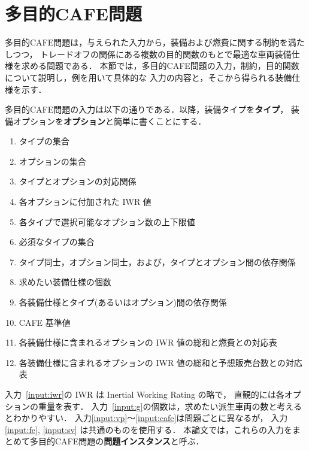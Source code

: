 \section{多目的CAFE問題}\label{sec:background}


多目的CAFE問題は，与えられた入力から，装備および燃費に関する制約を満たしつつ，
トレードオフの関係にある複数の目的関数のもとで最適な車両装備仕様を求める問題である．
本節では，多目的CAFE問題の入力，制約，目的関数について説明し，例を用いて具体的な
入力の内容と，そこから得られる装備仕様を示す．

多目的CAFE問題の入力は以下の通りである．以降，装備タイプを{\bf タイプ}，
装備オプションを{\bf オプション}と簡単に書くことにする．

\begin{enumerate} 
\setlength{\itemsep}{0cm}

 \item タイプの集合\label{input:vp}
\item オプションの集合\label{input:v}
\item タイプとオプションの対応関係\label{input:vp-v}
\item 各オプションに付加された IWR 値\label{input:iwr}
\item 各タイプで選択可能なオプション数の上下限値\label{input:ublb}
\item 必須なタイプの集合\label{input:req_vp}
\item タイプ同士，オプション同士，および，タイプとオプション間の依存関係
  \label{input:dependency}

\item 求めたい装備仕様の個数\label{input:g}
\item 各装備仕様とタイプ(あるいはオプション)間の依存関係\label{input:init}
\item CAFE 基準値\label{input:cafe}
\item 各装備仕様に含まれるオプションの IWR 値の総和と燃費との対応表\label{input:fe}
\item 各装備仕様に含まれるオプションの IWR 値の総和と予想販売台数との対応表\label{input:sv}
\end{enumerate}
入力~\ref{input:iwr}の IWR は Inertial Working Rating の略で，
直観的には各オプションの重量を表す．
入力~\ref{input:g}の個数は，求めたい派生車両の数と考えるとわかりやすい．
入力\ref{input:vp}〜\ref{input:cafe}は問題ごとに異なるが，
入力\ref{input:fe}, \ref{input:sv} は共通のものを使用する．
本論文では，これらの入力をまとめて多目的CAFE問題の{\bf 問題インスタンス}と呼ぶ．


